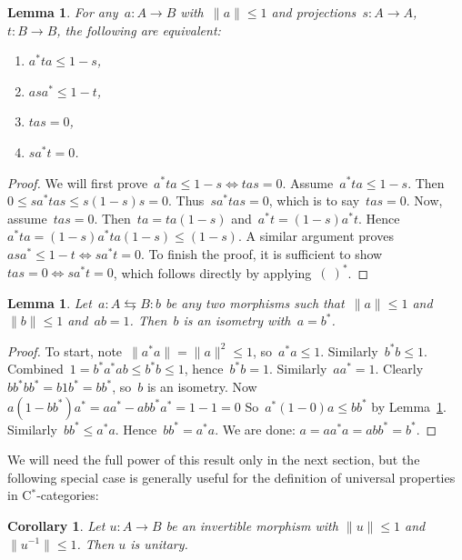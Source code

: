 \documentclass[reqno,T1]{amsproc}
\theoremstyle{plain}
\newtheorem{lem}[thm]{Lemma}
\newtheorem{cor}[thm]{Corollary}
\theoremstyle{remark}
\numberwithin{equation}{section}
\begin{document}
\begin{lem}
For any~$a\colon A \to B$ with~$\|a\| \leq 1$
    and projections~$s \colon A \to A$,
        $t\colon B\to B$,
	the following are equivalent:
\begin{enumerate}
\item $a^* t a \leq 1-s$,
\item $a s a^* \leq 1 - t$,
\item $tas = 0$,
\item $sa^* t = 0$.
\end{enumerate}
\label{contrapositionlemma}
\end{lem}
\begin{proof}
We will first prove~$a^*t a \leq 1-s \Leftrightarrow tas=0$.
    Assume~$a^* t a \leq 1-s$.
    Then~$0 \leq s a^* t a s \leq s (1-s) s = 0$.
    Thus~$s a^* t a s = 0$, which is to say~$tas = 0$.
    Now, assume~$tas = 0$.
    Then~$ta = ta(1-s)$ and~$a^*t = (1-s)a^* t$.
    Hence~$a^* ta = (1-s)a^*ta(1-s) \leq (1-s)$.
A similar argument proves~$as a^* \leq 1-t \Leftrightarrow sa^*t=0$.
To finish the proof, it is sufficient to
        show~$tas=0 \Leftrightarrow sa^*t=0$, which follows directly
        by applying~$(\ )^*$.
\end{proof}

\begin{lem}
Let~$a \colon A \leftrightarrows B \colon b$ be any two morphisms
    such that~$\|a \| \leq 1$ and $\| b\| \leq 1$ and~$ab=1$.
    Then~$b$ is an isometry with~$a=b^*$.
\label{isometrylemma}
\end{lem}
\begin{proof}
    To start, note~$\|a ^*a\| = \|a\|^2 \leq 1$, so~$a^*a \leq 1$.
    Similarly~$b^*b \leq 1$.
    Combined~$1 = b^*a^*ab \leq b^*b \leq 1$, hence~$b^*b=1$.
    Similarly~$aa^*=1$.
    Clearly~$bb^*bb^* = b 1 b^* = bb^*$, so~$b$ is an isometry.
    Now~$a (1-bb^*) a^* = aa^* - abb^*a^* = 1-1=0$
    So~$a^* (1-0) a \leq bb^*$ by Lemma~\ref{contrapositionlemma}.
    Similarly~$bb^* \leq a^*a$. Hence~$bb^*=a^*a$.
    We are done: $a = aa^*a=abb^*=b^*$.
\end{proof}

We will need the full power of this result only in the next section, but the following special case is generally useful for the definition of universal properties in C$^*$-categories:

\begin{cor}
Let $u : A \to B$ be an invertible morphism with $\| u \| \leq 1$ and $\| u^{-1} \| \leq 1$. Then $u$ is unitary.
\label{unitaries}
\end{cor}
\end{document}
